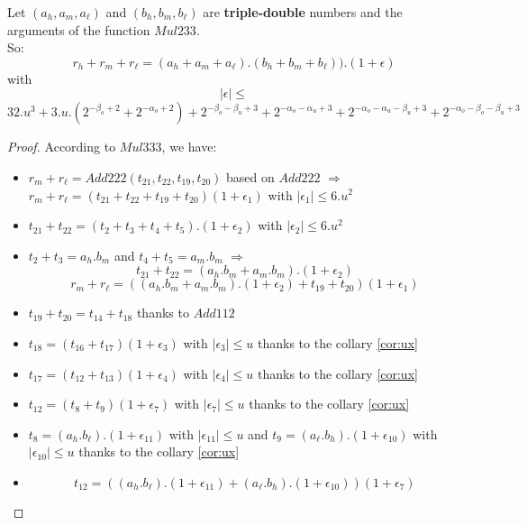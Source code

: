 \begin{theo}

Let $(a_h,a_m,a_{\ell})$  and $(b_h,b_m,b_{\ell})$ are \textbf{triple-double} numbers and the arguments of the function $Mul233$.\\
So:\\
$$r_h +r_m +r_{\ell} = (a_h +a_m + a_{\ell}). (b_h+ b_m +b_{\ell})).(1+\epsilon)$$ with $$\lvert \epsilon \rvert \le $$
$$ 32.u^3 + 3.u.(2^{-\beta_o+2} + 2^{-\alpha_o+2}) + 2^{-\beta_o - \beta_u +3} + 2^{-\alpha_o - \alpha_u +3} + 2^{-\alpha_o - \alpha_u  - \beta_u +3} + 2^{-\alpha_o -  \beta_o -\beta_u +3}$$
\end{theo}

\begin{proof} \color{-yellow}
According to $Mul333$, we have:
\begin{itemize}
    \item $r_m + r_{\ell} = Add222(t_{21}, t_{22}, t_{19}, t_{20})$ based on $Add222$ $\Rightarrow$ \\ 
    $r_m + r_{\ell} = (t_{21}+ t_{22}+ t_{19}+ t_{20})(1+\epsilon_1)$ with $\lvert \epsilon_1 \rvert \le 6.u^2$
    \item $t_{21}+t_{22} =(t_2+t_3+t_4+t_5).(1+\epsilon_2)$ with $\lvert \epsilon_2 \rvert \le 6.u^2 $
    \item $t_2 + t_3 = a_h.b_m$ and $t_4 + t_5 = a_m . b_m$ $\Rightarrow$ \\
    $$t_{21}+t_{22} =(a_h.b_m+a_m.b_m).(1+\epsilon_2)$$
    $$r_m + r_{\ell} = ((a_h.b_m+a_m.b_m).(1+\epsilon_2)+ t_{19}+ t_{20})(1+\epsilon_1)$$
    \item $t_{19}+ t_{20} = t_{14} + t_{18} $ thanks to $Add112$
    \item $t_{18} = (t_{16} + t_{17})(1+\epsilon_3)$ with $\lvert \epsilon_3 \rvert \le u$ thanks to the collary \ref{cor:ux}
    \item $t_{17} = (t_{12} + t_{13})(1+\epsilon_4)$ with $\lvert \epsilon_4 \rvert \le u$ thanks to the collary \ref{cor:ux}
    \item $t_{12} = (t_8 + t_9)(1+\epsilon_7)$ with $\lvert \epsilon_7 \rvert \le u$ thanks to the collary \ref{cor:ux}
    \item $t_{8} = (a_h.b_{\ell}).(1+\epsilon_{11})$ with $\lvert \epsilon_{11} \rvert \le u$  and $t_{9} = (a_{\ell}.b_h).(1+\epsilon_{10})$ with $\lvert \epsilon_{10} \rvert \le u$ thanks to the collary \ref{cor:ux}
    \item $$t_{12} = ((a_h.b_{\ell}).(1+\epsilon_{11}) + (a_{\ell}.b_h).(1+\epsilon_{10}))(1+\epsilon_7)$$

\end{itemize}
\end{proof}
